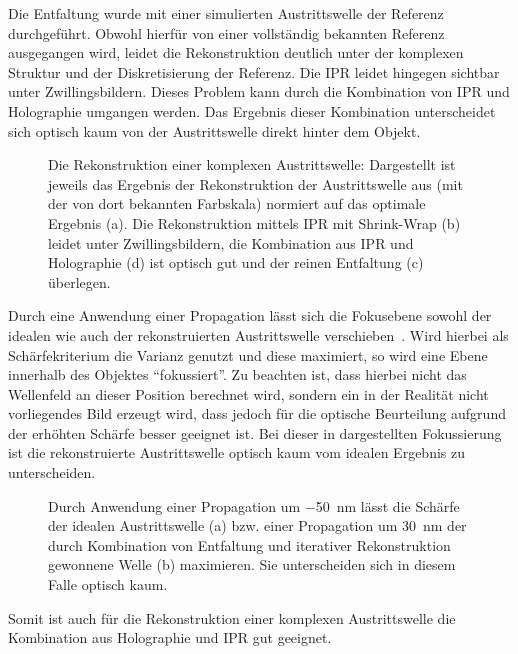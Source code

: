 Die Entfaltung wurde mit einer simulierten Austrittswelle der Referenz durchgeführt. Obwohl hierfür von einer vollständig bekannten Referenz ausgegangen wird, leidet die Rekonstruktion deutlich unter der komplexen Struktur und der Diskretisierung der Referenz. Die IPR leidet hingegen sichtbar unter Zwillingsbildern. Dieses Problem kann durch die Kombination von IPR und Holographie umgangen werden. Das Ergebnis dieser Kombination unterscheidet sich optisch kaum von der Austrittswelle direkt hinter dem Objekt.

\begin{figure}
	\centering
	\caption[Rekonstruktion einer Austrittswelle]{Die Rekonstruktion einer komplexen Austrittswelle: Dargestellt ist jeweils das Ergebnis der Rekonstruktion der Austrittswelle aus  (mit der von dort bekannten Farbskala) normiert auf das optimale Ergebnis (a). Die Rekonstruktion mittels IPR mit Shrink-Wrap (b) leidet unter Zwillingsbildern, die Kombination aus IPR und Holographie (d) ist optisch gut und der reinen Entfaltung (c) überlegen.}
	\label{fig:recon3d}
\end{figure}

Durch eine Anwendung einer Propagation lässt sich die Fokusebene sowohl der idealen wie auch der rekonstruierten Austrittswelle verschieben~\cite{ulmer2015}. Wird hierbei als Schärfekriterium die Varianz genutzt und diese maximiert, so wird eine Ebene innerhalb des Objektes "`fokussiert"'. Zu beachten ist, dass hierbei nicht das Wellenfeld an dieser Position berechnet wird, sondern ein in der Realität nicht vorliegendes Bild erzeugt wird, dass jedoch für die optische Beurteilung aufgrund der erhöhten Schärfe besser geeignet ist.  Bei dieser in  dargestellten Fokussierung ist die rekonstruierte Austrittswelle optisch kaum vom idealen Ergebnis zu unterscheiden.

\begin{figure}
	\centering
	\caption[Propagation der Austrittswelle]{Durch Anwendung einer Propagation um \SI{-50}{nm}  lässt die Schärfe der idealen Austrittswelle (a) bzw. einer Propagation um \SI{30}{nm} der durch Kombination von Entfaltung und iterativer Rekonstruktion gewonnene Welle (b) maximieren. Sie unterscheiden sich in diesem Falle optisch kaum.}
	\label{fig:recon_focus}
\end{figure}

Somit ist auch für die Rekonstruktion einer komplexen Austrittswelle die Kombination aus Holographie und IPR gut geeignet.